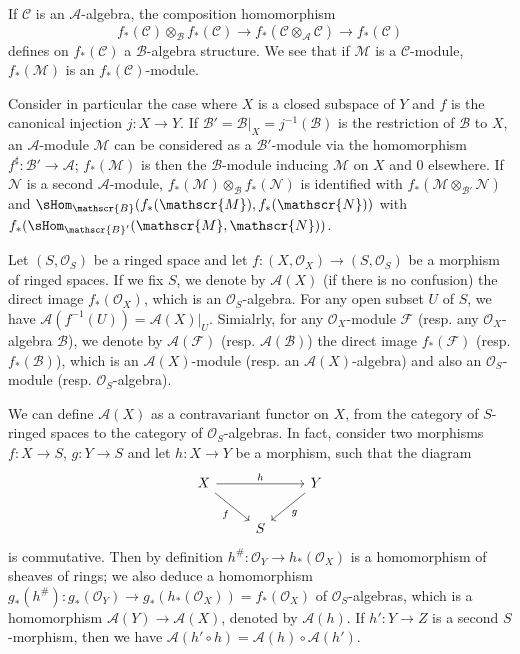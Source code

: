 If $\mathscr{C}$ is an $\mathscr{A}$-algebra, the composition homomorphism
\[f_*(\mathscr{C})\otimes_{\mathscr{B}}f_*(\mathscr{C})\to f_*(\mathscr{C}\otimes_{\mathscr{A}}\mathscr{C})\to f_*(\mathscr{C})\]
defines on $f_*(\mathscr{C})$ a $\mathscr{B}$-algebra structure. We see that if $\mathscr{M}$ is a $\mathscr{C}$-module, $f_*(\mathscr{M})$ is an $f_*(\mathscr{C})$-module.\par
Consider in particular the case where $X$ is a closed subspace of $Y$ and $f$ is the canonical injection $j:X\to Y$. If $\mathscr{B}'=\mathscr{B}|_X=j^{-1}(\mathscr{B})$ is the restriction of $\mathscr{B}$ to $X$, an $\mathscr{A}$-module $\mathscr{M}$ can be considered as a $\mathscr{B}'$-module via the homomorphism $f^{\sharp}:\mathscr{B}'\to\mathscr{A}$; $f_*(\mathscr{M})$ is then the $\mathscr{B}$-module inducing $\mathscr{M}$ on $X$ and $0$ elsewhere. If $\mathscr{N}$ is a second $\mathscr{A}$-module, $f_*(\mathscr{M})\otimes_{\mathscr{B}}f_*(\mathscr{N})$ is identified with $f_*(\mathscr{M}\otimes_{\mathscr{B}'}\mathscr{N})$ and $\sHom_{\mathscr{B}}(f_*(\mathscr{M}),f_*(\mathscr{N}))$ with $f_*(\sHom_{\mathscr{B}'}(\mathscr{M},\mathscr{N}))$.\par
Let $(S,\mathscr{O}_S)$ be a ringed space and let $f:(X,\mathscr{O}_X)\to(S,\mathscr{O}_S)$ be a morphism of ringed spaces. If we fix $S$, we denote by $\mathscr{A}(X)$ (if there is no confusion) the direct image $f_*(\mathscr{O}_X)$, which is an $\mathscr{O}_S$-algebra. For any open subset $U$ of $S$, we have $\mathscr{A}(f^{-1}(U))=\mathscr{A}(X)|_U$. Simialrly, for any $\mathscr{O}_X$-module $\mathscr{F}$ (resp. any $\mathscr{O}_X$-algebra $\mathscr{B}$), we denote by $\mathscr{A}(\mathscr{F})$ (resp. $\mathscr{A}(\mathscr{B})$) the direct image $f_*(\mathscr{F})$ (resp. $f_*(\mathscr{B})$), which is an $\mathscr{A}(X)$-module (resp. an $\mathscr{A}(X)$-algebra) and also an $\mathscr{O}_S$-module (resp. $\mathscr{O}_S$-algebra).\par
We can define $\mathscr{A}(X)$ as a contravariant functor on $X$, from the category of $S$-ringed spaces to the category of $\mathscr{O}_S$-algebras. In fact, consider two morphisms $f:X\to S$, $g:Y\to S$ and let $h:X\to Y$ be a morphism, such that the diagram
\[\begin{tikzcd}
X\ar[rd,swap,"f"]\ar[rr,"h"]&&Y\ar[ld,"g"]\\
&S
\end{tikzcd}\]
is commutative. Then by definition $h^{\#}:\mathscr{O}_Y\to h_*(\mathscr{O}_X)$ is a homomorphism of sheaves of rings; we also deduce a homomorphism $g_*(h^{\#}):g_*(\mathscr{O}_Y)\to g_*(h_*(\mathscr{O}_X))=f_*(\mathscr{O}_X)$ of $\mathscr{O}_S$-algebras, which is a homomorphism $\mathscr{A}(Y)\to\mathscr{A}(X)$, denoted by $\mathscr{A}(h)$. If $h':Y\to Z$ is a second $S$-morphism, then we have $\mathscr{A}(h'\circ h)=\mathscr{A}(h)\circ\mathscr{A}(h')$.\par
